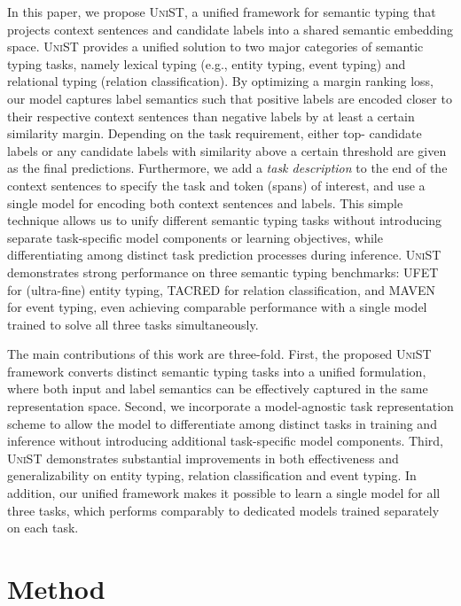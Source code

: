 \documentclass[11pt]{article}
\newcommand{\model}{\textsc{UniST}\xspace}
\begin{document}
In this paper, we propose \model, a unified framework for semantic typing that projects context sentences and candidate labels into a shared semantic embedding space. \model provides a unified solution to two major categories of semantic typing tasks, namely lexical typing (e.g., entity typing, event typing) and relational typing (relation classification). By optimizing a margin ranking loss, our model captures label semantics such that positive labels are encoded closer to their respective context sentences than negative labels by at least a certain similarity margin. Depending on the task requirement, either top- candidate labels or any candidate labels with similarity above a certain threshold are given as the final predictions. Furthermore, we add a \textit{task description} to the end of the context sentences to specify the task and token (spans) of interest, and use a single model for encoding both context sentences and labels. This simple technique allows us to unify different semantic typing tasks without introducing separate task-specific model components or learning objectives, while differentiating among distinct task prediction processes during inference. \model demonstrates strong performance on three semantic typing benchmarks: UFET \cite{choi-etal-2018-ultra} for (ultra-fine) entity typing, TACRED \cite{zhang-etal-2017-position} for relation classification, and MAVEN \cite{wang-etal-2020-maven} for event typing, even achieving comparable performance with a single model trained to solve all three tasks simultaneously.

The main contributions of this work are three-fold. First, the proposed \model framework converts distinct semantic typing tasks into a unified formulation, where both input and label semantics can be effectively captured in the same representation space. Second, we incorporate a model-agnostic task representation scheme to allow the model to differentiate among distinct tasks in training and inference without introducing additional task-specific model components. Third, \model demonstrates substantial improvements in both effectiveness and generalizability on entity typing, relation classification and event typing. In addition, our unified framework makes it possible to learn a single model for all three tasks, which performs comparably to dedicated models trained separately on each task. 
\section{Method}
\end{document}
